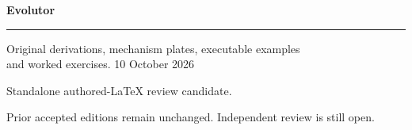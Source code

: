 \documentclass[11pt,oneside,openany]{book}
\begin{document}
\frontmatter
\begin{titlepage}
\color{Blue}\sffamily\vspace*{20mm}
{\Huge\bfseries Evolutor\par}
\vspace{10mm}{\LARGE Chapter 32\par}
\vspace{8mm}{\Large DOGMA state pools and memory ownership\par}
\vspace{12mm}\rule{\linewidth}{.8pt}
\vspace{6mm}\par Original derivations, mechanism plates, executable examples\\and worked exercises.
\vfill 10 October 2026\par
Standalone authored-LaTeX review candidate.\par
Prior accepted editions remain unchanged. Independent review is still open.
\end{titlepage}
\tableofcontents
\mainmatter
\setcounter{chapter}{31}

\renewcommand{\bibname}{Sources and references}

\backmatter
\clearpage{}
\printindex
\end{document}
